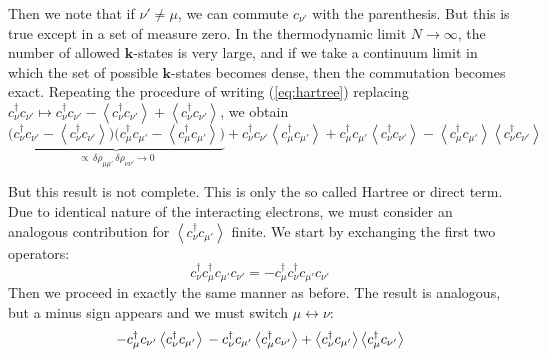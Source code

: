 Then we note that if $\nu' \neq \mu$, we can commute $c_{\nu'}$ with the parenthesis. But this is true except in a set of measure zero. In the thermodynamic limit $N \rightarrow \infty$, the number of allowed $\bm k$-states is very large, and if we take a continuum limit in which the set of possible $\bm k$-states becomes dense, then the commutation becomes exact. Repeating the procedure of writing (\ref{eq:hartree}) replacing $c_\nu^\dagger c_{\nu'} \mapsto c_\nu^\dagger c_{\nu'} - \left\langle c_\nu^\dagger c_{\nu'} \right\rangle + \left\langle c_\nu^\dagger c_{\nu'} \right\rangle $, we obtain
\begin{equation}\label{eq:mf}
\underbrace{\big( c_\nu^\dagger c_{\nu'} - \left\langle c_\nu^\dagger c_{\nu'} \right\rangle \big) \big( c_\mu^\dagger c_{\mu'} - \left\langle c_\mu^\dagger c_{\mu'} \right\rangle \big)}_{\propto \, \delta \rho_{\mu\mu'} \, \delta \rho_{\nu\nu'} \rightarrow 0} + c_\nu^\dagger c_{\nu'} \left\langle c_\mu^\dagger c_{\mu'} \right\rangle + c_\mu^\dagger c_{\mu'} \left\langle c_\nu^\dagger c_{\nu'} \right\rangle - \left\langle c_\mu^\dagger c_{\mu'} \right\rangle \left\langle c_\nu^\dagger c_{\nu'} \right\rangle
\end{equation}

But this result is not complete. This is only the so called Hartree or direct term. Due to identical nature of the interacting electrons, we must consider an analogous contribution for $\left\langle c_\nu^\dagger c_{\mu'} \right\rangle$ finite. We start by exchanging the first two operators: 
\begin{equation}
c_\nu^\dagger c_\mu^\dagger c_{\mu'} c_{\nu'} = - c_\mu^\dagger c_\nu^\dagger c_{\mu'} c_{\nu'}
\end{equation}
Then we proceed in exactly the same manner as before. The result is analogous, but a minus sign appears and we must switch $\mu \leftrightarrow \nu$:
\begin{equation}
- c_\mu^\dagger c_{\nu'} \left\langle c_\nu^\dagger c_{\mu'} \right\rangle \\
- c_\nu^\dagger c_{\mu'} \left\langle c_\mu^\dagger c_{\nu'} \right\rangle + \left\langle c_\nu^\dagger c_{\mu'} \right\rangle \left\langle c_\mu^\dagger c_{\nu'} \right\rangle
\end{equation}

